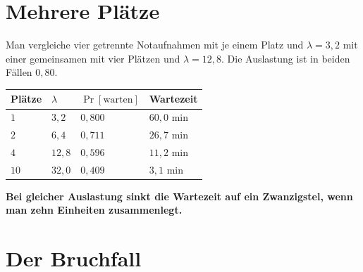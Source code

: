 \section{Mehrere Plätze}

\begin{merksatz}
Man vergleiche vier getrennte Notaufnahmen mit je einem Platz und $\lambda = 3{,}2$ mit einer gemeinsamen mit vier Plätzen und $\lambda = 12{,}8$. Die Auslastung ist in beiden Fällen $0{,}80$.

\begin{center}
{\small
\renewcommand{\arraystretch}{1.5}
\begin{tabular}{@{}P{1.6cm}P{2.0cm}P{2.4cm}P{2.4cm}@{}}
\toprule
\textbf{Plätze} & $\lambda$ & $\Pr[\text{warten}]$ & \textbf{Wartezeit}\\
\midrule
$1$ & $3{,}2$ & $0{,}800$ & $60{,}0$ min\\
$2$ & $6{,}4$ & $0{,}711$ & $26{,}7$ min\\
$4$ & $12{,}8$ & $0{,}596$ & $11{,}2$ min\\
$10$ & $32{,}0$ & $0{,}409$ & $3{,}1$ min\\
\bottomrule
\end{tabular}}
\end{center}

\begin{center}
\begin{minipage}{0.9\textwidth}
\textbf{Bei gleicher Auslastung sinkt die Wartezeit auf ein Zwanzigstel, wenn man zehn Einheiten zusammenlegt.}
\end{minipage}
\end{center}

\begin{center}
\begin{minipage}{0.88\textwidth}
\end{minipage}
\end{center}
\end{merksatz}

\section{Der Bruchfall}

